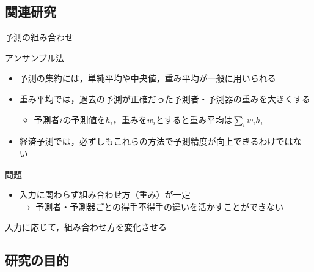 \documentclass[dvipdfmx,aspectratio=169]{beamer}
\begin{document}
\subsection{関連研究}

\begin{frame}{予測の組み合わせ}
\begin{block}{アンサンブル法~\cite{Zhou2012}}
  \begin{itemize}
    \item 予測の集約には，単純平均や中央値，重み平均が一般に用いられる
    \item 重み平均では，過去の予測が正確だった予測者・予測器の重みを大きくする
    \begin{itemize}
      \item 予測者$i$の予測値を$h_i$，重みを$w_i$とすると重み平均は$\sum_i w_i h_i$
    \end{itemize}
    \item 経済予測では，必ずしもこれらの方法で予測精度が向上できるわけではない~\cite{Ang2007}
  \end{itemize}
\end{block}
\begin{alertblock}{問題}
  \begin{itemize}
    \item 入力に関わらず組み合わせ方（重み）が一定\\
          $\to$ 予測者・予測器ごとの得手不得手の違いを活かすことができない
  \end{itemize}
\end{alertblock}
\begin{alertblock}{}
  \centering
  \alert{入力に応じて，組み合わせ方を変化させる}
\end{alertblock}
\end{frame}

\subsection{研究の目的}
\end{document}

